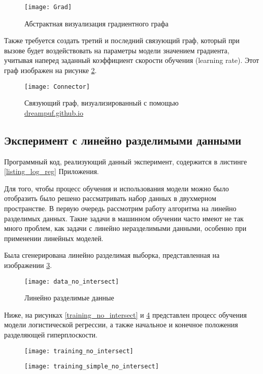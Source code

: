 \begin{figure}[h]
    \centering
    \texttt{[image: Grad]}
    \caption{Абстрактная визуализация градиентного графа}
    \label{Grad}
\end{figure}

\clearpage
Также требуется создать третий и последний связующий граф, который при вызове будет воздействовать на параметры модели значением градиента, учитывая наперед заданный коэффициент скорости обучения (learning rate). Этот граф изображен на рисунке \ref{Connector}.

\begin{figure}[h]
    \centering
    \texttt{[image: Connector]}
    \caption{Связующий граф, визуализированный с помощью \href{https://dreampuf.github.io/GraphvizOnline}{dreampuf.github.io}}
    \label{Connector}
\end{figure}

\subsection{Эксперимент с линейно разделимыми данными}
Программный код, реализующий данный эксперимент, содержится в листинге \ref{listing_log_reg} Приложения.

Для того, чтобы процесс обучения и использования модели можно было отобразить было решено рассматривать набор данных в двухмерном пространстве. В первую очередь рассмотрим работу алгоритма на линейно разделимых данных. Такие задачи в машинном обучении часто имеют не так много проблем, как задачи с линейно неразделимыми данными, особенно при применении линейных моделей.

Была сгенерирована линейно разделимая выборка, представленная на изображении \ref{data_no_intersect}.

\begin{figure}[h]
    \centering
    \texttt{[image: data\_no\_intersect]}
    \caption{Линейно разделимые данные}
    \label{data_no_intersect}
\end{figure}

Ниже, на рисунках \ref{training_no_intersect} и \ref{training_simple_no_intersect} представлен процесс обучения модели логистической регрессии, а также начальное и конечное положения разделяющей гиперплоскости.

\begin{figure}
\centering
\begin{minipage}{.5\textwidth}
  \centering
  \texttt{[image: training\_no\_intersect]}
  \label{training_no_intersect}
\end{minipage}%
\begin{minipage}{.5\textwidth}
  \centering
  \texttt{[image: training\_simple\_no\_intersect]}
  \label{training_simple_no_intersect}
\end{minipage}
\end{figure}

